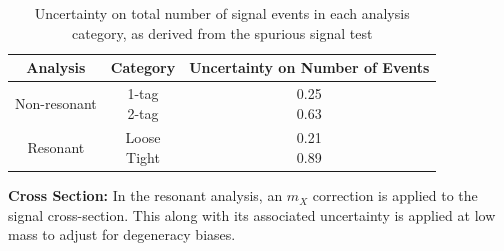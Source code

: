 \begin{table}[htbp]
  \centering
  \caption[Uncertainty on total number of signal events in each analysis category]{Uncertainty on total number of signal events in each analysis category, as derived from the spurious signal test}
  \label{tab:unc-sig-events}
  \begin{tabular}{c|c|c}
    Analysis & Category & Uncertainty on Number of Events \\
    \hline 
    Non-resonant &\makecell{1-tag\\2-tag} & \makecell{0.25\\0.63}\\
    \hline
    Resonant & \makecell{Loose\\Tight} & \makecell{0.21\\0.89}\\
  \end{tabular}
\end{table}

\noindent\textbf{Cross Section:} In the resonant analysis, an $m_X$ correction is applied to the signal cross-section. This along with its associated uncertainty is applied at low mass to adjust for degeneracy biases. %


